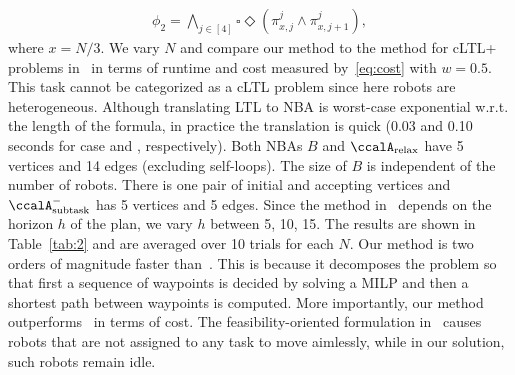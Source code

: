 \documentclass[Afour,sageh,times]{sagej}
\newcommand{\auto}[1]{\ccalA_{\text{#1}}}
\renewcommand{\ap}[3]{\mathcal{\pi}_{{#1},{#2}}^{#3}}
\newcommand{\RNum}[1]{\uppercase\expandafter{\romannumeral #1\relax}}
\begin{document}
{{\small
\begin{align*}
   \phi_2 = \bigwedge\nolimits_{j\in[4]} \square \Diamond( \ap{x}{j}{j} \wedge \ap{x}{j+1}{j} ) ,
\end{align*}
\normalsize
where $x = N/3$. We vary $N$ and compare our method to the method for cLTL+ problems in~\cite{sahin2019multirobot} in terms of runtime and cost measured by~\eqref{eq:cost} with $w=0.5$. This task cannot be categorized as a cLTL problem since here robots are heterogeneous. {Although translating LTL to NBA is worst-case exponential w.r.t. the length of the formula, in practice the translation is quick (0.03 and 0.10 seconds for case \RNum{1} and \RNum{2}, respectively). Both NBAs $B$ and $\auto{relax}$ have 5 vertices and 14 edges (excluding self-loops). The size of $B$ is independent of the number of robots. There is one pair of initial and accepting vertices and  $\auto{subtask}^-$ has 5 vertices and 5 edges.} Since the method in~\cite{sahin2019multirobot} depends on the horizon $h$ of the plan, we vary $h$ between 5, 10, 15. The results  are shown in Table~\ref{tab:2} and are averaged over 10 trials for each $N$. Our method is two orders of magnitude faster than~\cite{sahin2019multirobot}. This is because it decomposes the problem so that first a sequence of waypoints is decided by solving a MILP and then a shortest path  between waypoints is computed. More importantly, our method outperforms~\cite{sahin2019multirobot} in terms of cost.  The feasibility-oriented formulation in~\cite{sahin2019multirobot} causes robots that are not assigned to any task to move aimlessly, while in our solution, such robots remain idle.

}}
\end{document}
